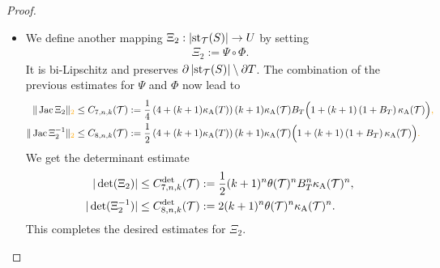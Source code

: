 \documentclass[10pt,letterpaper]{article}
\newcommand\cye[1]{%
  \protect\leavevmode
  \begingroup
    \color{red!35!yellow}%
    #1%
  \endgroup
}
\begin{document}
\begin{proof}
\begin{itemize}
        
        \item 
        We define another mapping $ \Xi_{2} : \left| \operatorname{st}_{{\mathcal T}}(S) \right| \rightarrow U $ by setting 
        \begin{align*}
            \Xi_{2} := \Psi \circ \Phi.
        \end{align*}
        It is bi-Lipschitz and preserves $\partial\left| \operatorname{st}_{{\mathcal T}}(S) \right| \setminus \partial T$. 
        The combination of the previous estimates for $\Psi$ and $\Phi$ now lead to 
        \begin{align*}
            \| \Jacobian \Xi_{2} \|_{\cye{2}}
            &\leq 
            \Csieb{n}{k}(\calT)
            :=
            \frac 1 4
            \left( 4 + (k+1) \kappa_{\maxcol}(T) \right)
            (k+1) 
            \kappa_{\maxcol}(\calT)
            B_{T}
            \Big( 
                1 
                + 
                (k+1) 
                \left( 1 + B_{T} \right)
                \kappa_{\maxcol}(\calT)
            \Big)\cye{,}            
            \\
            \| \Jacobian \Xi_{2}^{-1} \|_{\cye{2}}
            &\leq  
            \Cacht{n}{k}(\calT)
            :=
            \frac 1 2
            \left( 4 + (k+1) \kappa_{\maxcol}(T) \right)
            (k+1) 
            \kappa_{\maxcol}(\calT)
            \Big( 
                1 
                + 
                (k+1) 
                \left( 1 + B_{T} \right)
                \kappa_{\maxcol}(\calT)
            \Big)\cye{.}            
        \end{align*}
        We get the determinant estimate 
        \begin{align*}
            |\det(\Xi_{2})|
            &\leq 
            C^{\det}_{7,n,k}({\mathcal T})
            :=
            \frac 1 2 
            (k+1)^{n}
            \theta({\mathcal T})^{n}
            B_{T}^{n}
            \kappa_{{\rm A}}({\mathcal T})^{n}
            ,
            \\
            |\det(\Xi_{2}^{-1})|
            &\leq 
            C^{\det}_{8,n,k}({\mathcal T})
            :=
            2
            (k+1)^{n}
            \theta({\mathcal T})^{n}
            \kappa_{{\rm A}}({\mathcal T})^{n}
            .
        \end{align*}
        This completes the desired estimates for $\Xi_{2}$. 
        

\end{itemize}
\end{proof}
\end{document}
